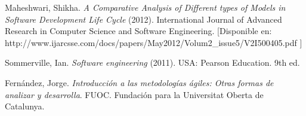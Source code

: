 \documentclass[spanish,12pt,letterpapper]{article}
\begin{document}
	
	
	\pagebreak
	\begin{thebibliography}{9}
	  Maheshwari, Shikha. 
		\emph{A Comparative Analysis of Different types of Models in Software Development Life Cycle} (2012). International Journal of Advanced Research in Computer Science and Software Engineering. [Disponible en: http://www.ijarcsse.com/docs/papers/May2012/Volum2\_issue5/V2I500405.pdf ]
		
		  Sommerville, Ian. 
		\emph{Software engineering} (2011). USA:  Pearson Education. 9th ed. 
		
		  Fernández, Jorge. 
		\emph{Introducción a las metodologías ágiles: Otras formas de analizar y desarrolla}. FUOC. Fundación para la Universitat Oberta de Catalunya. 
		
	\end{thebibliography}
	
\end{document}
